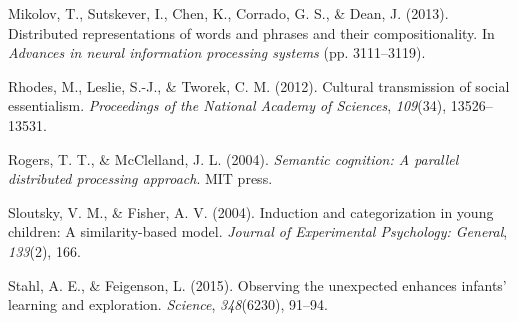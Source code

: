 \documentclass[10pt, letterpaper]{article}
\begin{document}
\leavevmode\hypertarget{ref-mikolov2013}{}%
Mikolov, T., Sutskever, I., Chen, K., Corrado, G. S., \& Dean, J.
(2013). Distributed representations of words and phrases and their
compositionality. In \emph{Advances in neural information processing
systems} (pp. 3111--3119).

\leavevmode\hypertarget{ref-rhodes2012}{}%
Rhodes, M., Leslie, S.-J., \& Tworek, C. M. (2012). Cultural
transmission of social essentialism. \emph{Proceedings of the National
Academy of Sciences}, \emph{109}(34), 13526--13531.

\leavevmode\hypertarget{ref-rogers2004}{}%
Rogers, T. T., \& McClelland, J. L. (2004). \emph{Semantic cognition: A
parallel distributed processing approach}. MIT press.

\leavevmode\hypertarget{ref-sloutsky2004}{}%
Sloutsky, V. M., \& Fisher, A. V. (2004). Induction and categorization
in young children: A similarity-based model. \emph{Journal of
Experimental Psychology: General}, \emph{133}(2), 166.

\leavevmode\hypertarget{ref-stahl2015}{}%
Stahl, A. E., \& Feigenson, L. (2015). Observing the unexpected enhances
infants' learning and exploration. \emph{Science}, \emph{348}(6230),
91--94.


\end{document}

